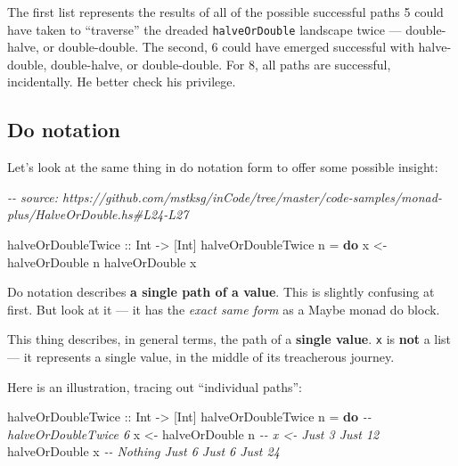 \documentclass[]{article}
\newenvironment{Shaded}{}{}
\newcommand{\CommentTok}[1]{\textcolor[rgb]{0.38,0.63,0.69}{\textit{#1}}}
\newcommand{\DataTypeTok}[1]{\textcolor[rgb]{0.56,0.13,0.00}{#1}}
\newcommand{\KeywordTok}[1]{\textcolor[rgb]{0.00,0.44,0.13}{\textbf{#1}}}
\newcommand{\NormalTok}[1]{#1}
\newcommand{\OtherTok}[1]{\textcolor[rgb]{0.00,0.44,0.13}{#1}}
\begin{document}
The first list represents the results of all of the possible successful paths 5
could have taken to ``traverse'' the dreaded \texttt{halveOrDouble} landscape
twice --- double-halve, or double-double. The second, 6 could have emerged
successful with halve-double, double-halve, or double-double. For 8, all paths
are successful, incidentally. He better check his privilege.

\subsection{Do notation}\label{do-notation}

Let's look at the same thing in do notation form to offer some possible insight:

\begin{Shaded}
\begin{Highlighting}[]
\CommentTok{{-}{-} source: https://github.com/mstksg/inCode/tree/master/code{-}samples/monad{-}plus/HalveOrDouble.hs\#L24{-}L27}

\OtherTok{halveOrDoubleTwice ::} \DataTypeTok{Int} \OtherTok{{-}\textgreater{}}\NormalTok{ [}\DataTypeTok{Int}\NormalTok{]}
\NormalTok{halveOrDoubleTwice n }\OtherTok{=} \KeywordTok{do}
\NormalTok{    x }\OtherTok{\textless{}{-}}\NormalTok{ halveOrDouble n}
\NormalTok{    halveOrDouble x}
\end{Highlighting}
\end{Shaded}

Do notation describes \textbf{a single path of a value}. This is slightly
confusing at first. But look at it --- it has the \emph{exact same form} as a
Maybe monad do block.

This thing describes, in general terms, the path of a \textbf{single value}.
\texttt{x} is \textbf{not} a list --- it represents a single value, in the
middle of its treacherous journey.

Here is an illustration, tracing out ``individual paths'':

\begin{Shaded}
\begin{Highlighting}[]
\OtherTok{halveOrDoubleTwice ::} \DataTypeTok{Int} \OtherTok{{-}\textgreater{}}\NormalTok{ [}\DataTypeTok{Int}\NormalTok{]}
\NormalTok{halveOrDoubleTwice n }\OtherTok{=} \KeywordTok{do}       \CommentTok{{-}{-} halveOrDoubleTwice 6}
\NormalTok{    x }\OtherTok{\textless{}{-}}\NormalTok{ halveOrDouble n        }\CommentTok{{-}{-} x \textless{}{-}     Just 3          Just 12}
\NormalTok{    halveOrDouble x             }\CommentTok{{-}{-}      Nothing  Just 6  Just 6  Just 24}
\end{Highlighting}
\end{Shaded}
\end{document}
